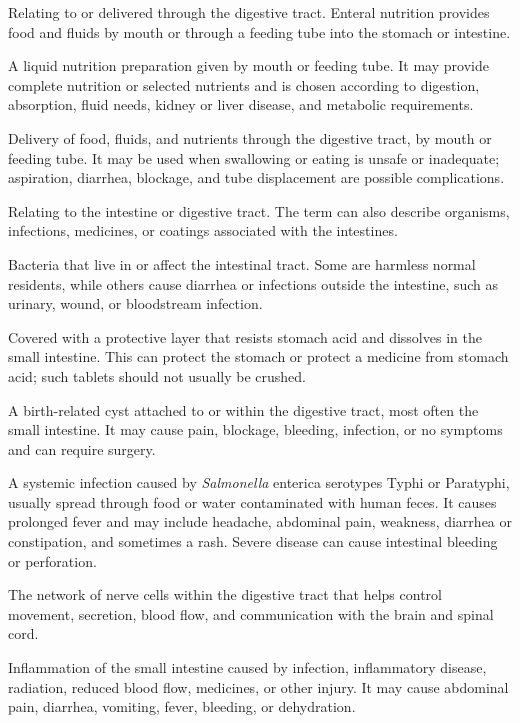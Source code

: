  Relating to or delivered through the digestive tract. Enteral nutrition provides food and fluids by mouth or through a feeding tube into the stomach or intestine.

 A liquid nutrition preparation given by mouth or feeding tube. It may provide complete nutrition or selected nutrients and is chosen according to digestion, absorption, fluid needs, kidney or liver disease, and metabolic requirements.

 Delivery of food, fluids, and nutrients through the digestive tract, by mouth or feeding tube. It may be used when swallowing or eating is unsafe or inadequate; aspiration, diarrhea, blockage, and tube displacement are possible complications.

 Relating to the intestine or digestive tract. The term can also describe organisms, infections, medicines, or coatings associated with the intestines.

 Bacteria that live in or affect the intestinal tract. Some are harmless normal residents, while others cause diarrhea or infections outside the intestine, such as urinary, wound, or bloodstream infection.

 Covered with a protective layer that resists stomach acid and dissolves in the small intestine. This can protect the stomach or protect a medicine from stomach acid; such tablets should not usually be crushed.

 A birth-related cyst attached to or within the digestive tract, most often the small intestine. It may cause pain, blockage, bleeding, infection, or no symptoms and can require surgery.

 A systemic infection caused by \textit{Salmonella} enterica serotypes Typhi or Paratyphi, usually spread through food or water contaminated with human feces. It causes prolonged fever and may include headache, abdominal pain, weakness, diarrhea or constipation, and sometimes a rash. Severe disease can cause intestinal bleeding or perforation.


 The network of nerve cells within the digestive tract that helps control movement, secretion, blood flow, and communication with the brain and spinal cord.

 Inflammation of the small intestine caused by infection, inflammatory disease, radiation, reduced blood flow, medicines, or other injury. It may cause abdominal pain, diarrhea, vomiting, fever, bleeding, or dehydration.

